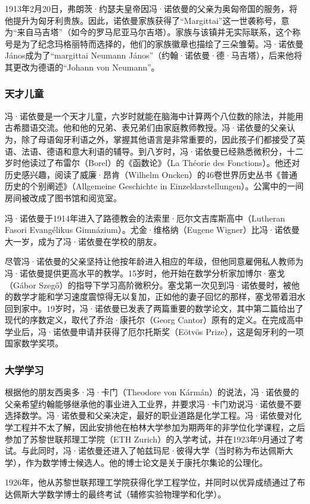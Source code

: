 1913年2月20日，弗朗茨·约瑟夫皇帝因冯·诺依曼的父亲为奥匈帝国的服务，将他提升为匈牙利贵族。因此，诺依曼家族获得了“Margittai”这一世袭称号，意为“来自马吉塔”（如今的罗马尼亚马尔吉塔）。家族与该镇并无实际联系，这个称号是为了纪念玛格丽特而选择的，他们的家族徽章也描绘了三朵雏菊。冯·诺依曼János成为了“margittai Neumann János”（约翰·诺依曼·德·马吉塔），后来他将其更改为德语的“Johann von Neumann”。
\subsubsection{天才儿童}  
冯·诺依曼是一个天才儿童，六岁时就能在脑海中计算两个八位数的除法，并能用古希腊语交流。他和他的兄弟、表兄弟们由家庭教师教授。冯·诺依曼的父亲认为，除了母语匈牙利语之外，掌握其他语言是非常重要的，因此孩子们都接受了英语、法语、德语和意大利语的辅导。到八岁时，冯·诺依曼已经熟悉微积分，十二岁时他读过了布雷尔（Borel）的《函数论》（La Théorie des Fonctions）。他还对历史感兴趣，阅读了威廉·昂肯（Wilhelm Oncken）的46卷世界历史丛书《普通历史的个别阐述》（Allgemeine Geschichte in Einzeldarstellungen）。公寓中的一间房间被改成了图书馆和阅览室。

冯·诺依曼于1914年进入了路德教会的法索里·厄尔文吉库斯高中（Lutheran Fasori Evangélikus Gimnázium）。尤金·维格纳（Eugene Wigner）比冯·诺依曼大一岁，成为了冯·诺依曼在学校的朋友。

尽管冯·诺依曼的父亲坚持让他按年龄进入相应的年级，但他同意雇佣私人教师为冯·诺依曼提供更高水平的教学。15岁时，他开始在数学分析家加博尔·塞戈（Gábor Szegő）的指导下学习高阶微积分。塞戈第一次见到冯·诺依曼时，被他的数学才能和学习速度震惊得无以复加，正如他的妻子回忆的那样，塞戈带着泪水回到家中。19岁时，冯·诺依曼已发表了两篇重要的数学论文，其中第二篇给出了现代的序数定义，取代了乔治·康托尔（Georg Cantor）原有的定义。在完成高中学业后，冯·诺依曼申请并获得了厄尔托斯奖（Eötvös Prize），这是匈牙利的一项国家数学奖项。
\subsubsection{大学学习}
根据他的朋友西奥多·冯·卡门（Theodore von Kármán）的说法，冯·诺依曼的父亲希望约翰能够继承他的事业进入工业界，并要求冯·卡门劝说冯·诺依曼不要选择数学。冯·诺依曼和父亲决定，最好的职业道路是化学工程。冯·诺依曼对化学工程并不太了解，因此安排他在柏林大学参加为期两年的非学位化学课程，之后参加了苏黎世联邦理工学院（ETH Zurich）的入学考试，并在1923年9月通过了考试。与此同时，冯·诺依曼还进入了帕兹玛尼·彼得大学（当时称为布达佩斯大学），作为数学博士候选人。他的博士论文是关于康托尔集论的公理化。

1926年，他从苏黎世联邦理工学院获得化学工程学位，并同时以优异成绩通过了布达佩斯大学数学博士的最终考试（辅修实验物理学和化学）。

